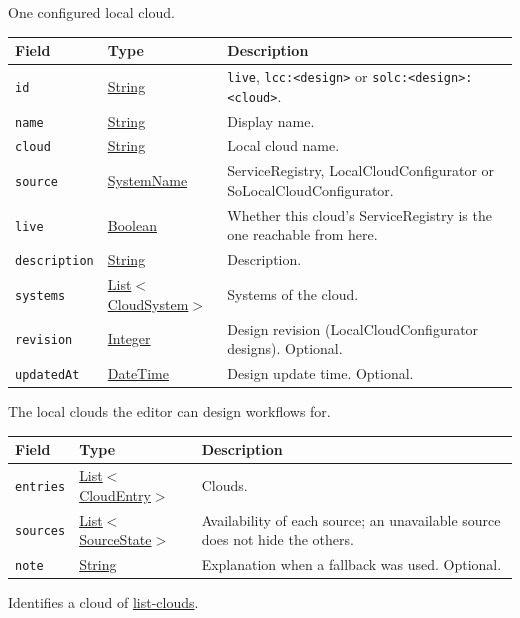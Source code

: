 \documentclass[a4paper]{arrowhead}
\newcommand{\mref}[1]{{\textcolor{ArrowheadPurple}{\hyperref[sec:model:#1]{#1}}}}
\newcommand{\oref}[1]{{\textcolor{ArrowheadBlue}{\hyperref[sec:operations:#1]{#1}}}}
\newcommand{\pref}[1]{{\textcolor{ArrowheadGrey}{\hyperref[sec:model:primitives:#1]{#1}}}}
\begin{document}
One configured local cloud.

{\small
\begin{longtable}{|p{3.9cm}|p{4.4cm}|p{7.5cm}|}

\hline
\rowcolor{gray!33} Field & Type & Description \\ \hline
\endhead
\texttt{id} & \pref{String} & \texttt{live}, \texttt{lcc:<design>} or \texttt{solc:<design>:<cloud>}. \\ \hline
\texttt{name} & \pref{String} & Display name. \\ \hline
\texttt{cloud} & \pref{String} & Local cloud name. \\ \hline
\texttt{source} & \pref{SystemName} & ServiceRegistry, LocalCloudConfigurator or SoLocalCloudConfigurator. \\ \hline
\texttt{live} & \pref{Boolean} & Whether this cloud's ServiceRegistry is the one reachable from here. \\ \hline
\texttt{description} & \pref{String} & Description. \\ \hline
\texttt{systems} & \pref{List}$<$\mref{CloudSystem}$>$ & Systems of the cloud. \\ \hline
\texttt{revision} & \pref{Integer} & Design revision (LocalCloudConfigurator designs). Optional. \\ \hline
\texttt{updatedAt} & \pref{DateTime} & Design update time. Optional. \\ \hline
\end{longtable}
}

The local clouds the editor can design workflows for.

{\small
\begin{longtable}{|p{3.9cm}|p{4.4cm}|p{7.5cm}|}

\hline
\rowcolor{gray!33} Field & Type & Description \\ \hline
\endhead
\texttt{entries} & \pref{List}$<$\mref{CloudEntry}$>$ & Clouds. \\ \hline
\texttt{sources} & \pref{List}$<$\mref{SourceState}$>$ & Availability of each source; an unavailable source does not hide the others. \\ \hline
\texttt{note} & \pref{String} & Explanation when a fallback was used. Optional. \\ \hline
\end{longtable}
}

Identifies a cloud of \oref{list-clouds}.
\end{document}
